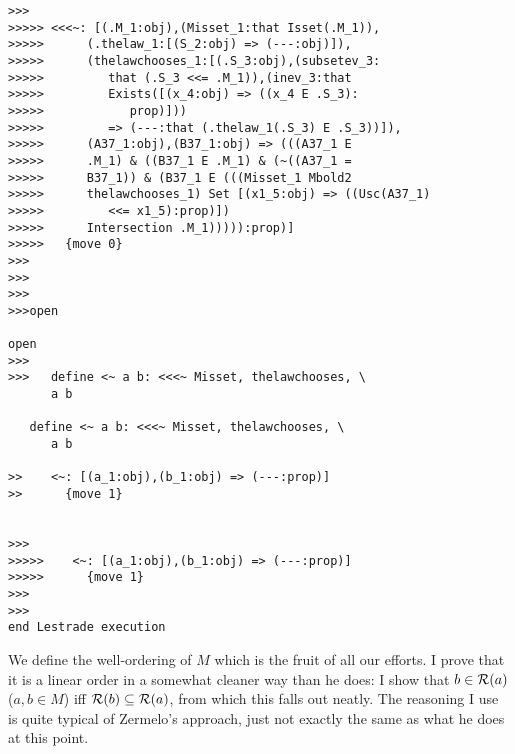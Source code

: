\documentclass[12pt]{article}
\begin{document}
\begin{verbatim}
>>>
>>>>> <<<~: [(.M_1:obj),(Misset_1:that Isset(.M_1)),
>>>>>      (.thelaw_1:[(S_2:obj) => (---:obj)]),
>>>>>      (thelawchooses_1:[(.S_3:obj),(subsetev_3:
>>>>>         that (.S_3 <<= .M_1)),(inev_3:that
>>>>>         Exists([(x_4:obj) => ((x_4 E .S_3):
>>>>>            prop)]))
>>>>>         => (---:that (.thelaw_1(.S_3) E .S_3))]),
>>>>>      (A37_1:obj),(B37_1:obj) => (((A37_1 E
>>>>>      .M_1) & ((B37_1 E .M_1) & (~((A37_1 =
>>>>>      B37_1)) & (B37_1 E (((Misset_1 Mbold2
>>>>>      thelawchooses_1) Set [(x1_5:obj) => ((Usc(A37_1)
>>>>>         <<= x1_5):prop)])
>>>>>      Intersection .M_1))))):prop)]
>>>>>   {move 0}
>>>
>>>
>>>
>>>open

open
>>>
>>>   define <~ a b: <<<~ Misset, thelawchooses, \
      a b

   define <~ a b: <<<~ Misset, thelawchooses, \
      a b

>>    <~: [(a_1:obj),(b_1:obj) => (---:prop)]
>>      {move 1}


>>>
>>>>>    <~: [(a_1:obj),(b_1:obj) => (---:prop)]
>>>>>      {move 1}
>>>
>>>
end Lestrade execution
\end{verbatim}

We define the well-ordering of $M$ which is the fruit of all our efforts.  I prove that it is a linear order in a somewhat cleaner way than he does:
I show that $b \in {\cal R}(a)$ ($a,b \in M$) iff ${\cal R}(b) \subseteq {\cal R}(a)$, from which this falls out neatly.  The reasoning I use is quite typical of Zermelo's approach, just not exactly the same as what he does at this point.
\end{document}
